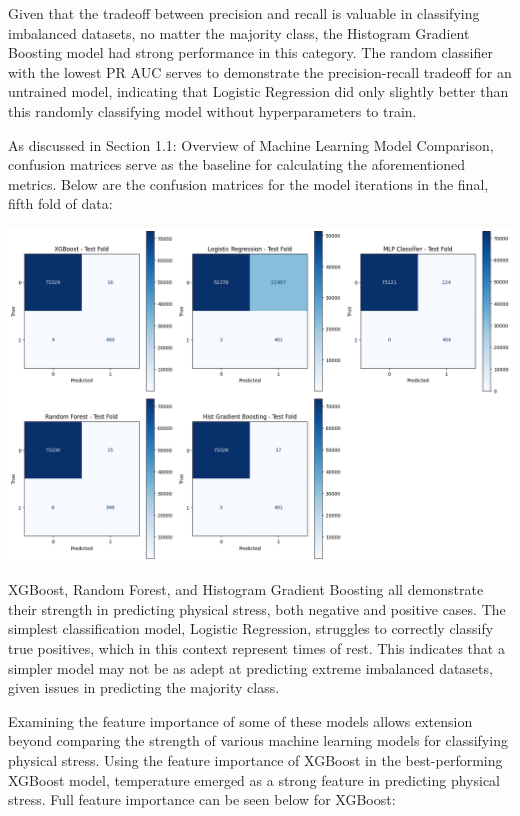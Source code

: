 \documentclass{article}
\begin{document}
Given that the tradeoff between precision and recall is valuable in classifying imbalanced datasets, no matter the majority class, the Histogram Gradient Boosting model had strong performance in this category. The random classifier with the lowest PR AUC serves to demonstrate the precision-recall tradeoff for an untrained model, indicating that Logistic Regression did only slightly better than this randomly classifying model without hyperparameters to train.

As discussed in Section 1.1: Overview of Machine Learning Model Comparison, confusion matrices serve as the baseline for calculating the aforementioned metrics. Below are the confusion matrices for the model iterations in the final, fifth fold of data:

\begin{center}
    \includegraphics[scale = .20]{images/confusion matrices.png}
\end{center}

XGBoost, Random Forest, and Histogram Gradient Boosting all demonstrate their strength in predicting physical stress, both negative and positive cases. The simplest classification model, Logistic Regression, struggles to correctly classify true positives, which in this context represent times of rest. This indicates that a simpler model may not be as adept at predicting extreme imbalanced datasets, given issues in predicting the majority class. 

Examining the feature importance of some of these models allows extension beyond comparing the strength of various machine learning models for classifying physical stress. Using the feature importance of XGBoost in the best-performing XGBoost model, temperature emerged as a strong feature in predicting physical stress. Full feature importance can be seen below for XGBoost: 
\end{document}
